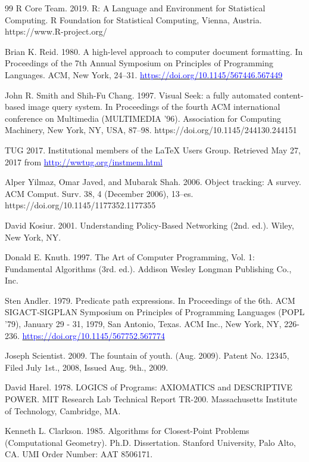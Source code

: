 \documentclass[conference]{IEEEtran}
\begin{document}
\begin{thebibliography}{99}
 R Core Team. 2019. R: A Language and Environment for Statistical Computing.  R Foundation for Statistical Computing, Vienna, Austria.   https://www.R-project.org/

 Brian K. Reid. 1980.   A high-level approach to computer document formatting. In Proceedings of the 7th Annual Symposium on Principles of Programming Languages. ACM, New York, 24–31. \href{https://doi.org/10.1145/567446.567449}{\textcolor{blue}{https://doi.org/10.1145/567446.567449}}

 John R. Smith and Shih-Fu Chang. 1997. Visual Seek: a fully automated content-based image query system. In Proceedings of the fourth ACM international conference on Multimedia (MULTIMEDIA ’96). Association for Computing Machinery, New York, NY, USA, 87–98. https://doi.org/10.1145/244130.244151

 TUG 2017. Institutional members of the LaTeX Users Group.  Retrieved May 27, 2017 from \href{http://wwtug.org/instmem.html}{\textcolor{blue}{http://wwtug.org/instmem.html}}

 Alper Yilmaz, Omar Javed, and Mubarak Shah. 2006. Object tracking: A survey. ACM Comput. Surv. 38, 4 (December 2006), 13–es. https://doi.org/10.1145/1177352.1177355

 David Kosiur. 2001. Understanding Policy-Based Networking (2nd. ed.). Wiley, New York, NY.

 Donald E. Knuth. 1997. The Art of Computer Programming, Vol. 1: Fundamental Algorithms (3rd. ed.). Addison Wesley Longman Publishing Co., Inc.

 Sten Andler. 1979. Predicate path expressions. In Proceedings of the 6th. ACM SIGACT-SIGPLAN Symposium on Principles of Programming Languages (POPL '79), January 29 - 31, 1979, San Antonio, Texas. ACM Inc., New York, NY, 226-236. \href{https://doi.org/10.1145/567752.567774}{\textcolor{blue}{https://doi.org/10.1145/567752.567774}}

 Joseph Scientist. 2009. The fountain of youth. (Aug. 2009). Patent No. 12345, Filed July 1st., 2008, Issued Aug. 9th., 2009.

 David Harel. 1978. LOGICS of Programs: AXIOMATICS and DESCRIPTIVE POWER. MIT Research Lab Technical Report TR-200. Massachusetts Institute of Technology, Cambridge, MA.

 Kenneth L. Clarkson. 1985. Algorithms for Closest-Point Problems (Computational Geometry). Ph.D. Dissertation. Stanford University, Palo Alto, CA. UMI Order Number: AAT 8506171.


\end{thebibliography}
\end{document}
